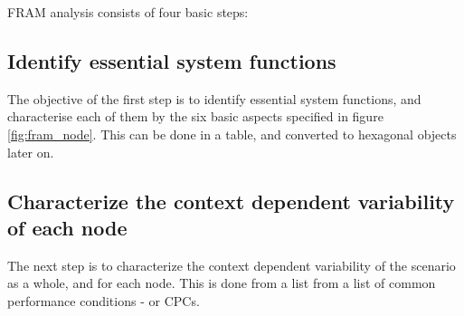 \documentclass[10pt,oneside]{book}                  %
\begin{document}
FRAM analysis consists of four basic steps:

\subsection{Identify essential system functions}
The objective of the first step is to identify essential system functions, and characterise each of them by the six basic aspects specified in figure \ref{fig:fram_node}. This can be done in a table, and converted to hexagonal objects later on.
\subsection{Characterize the context dependent variability of each node}
The next step is to characterize the context dependent variability of the scenario as a whole, and for each node. This is done from a list from a list of common performance conditions - or CPCs. 



\end{document}
